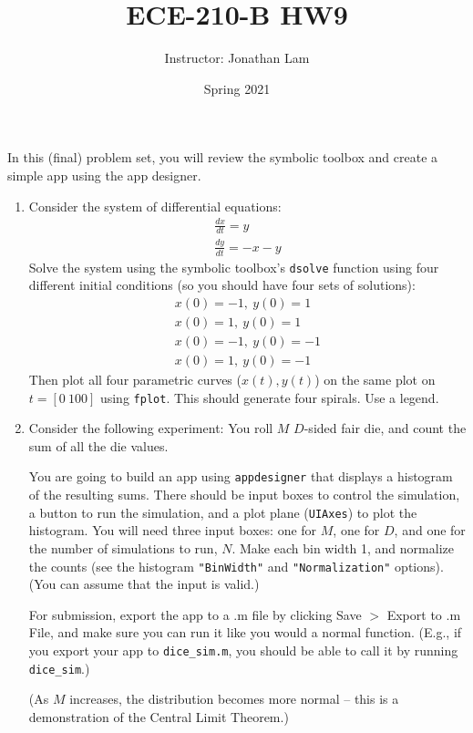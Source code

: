 \documentclass{article}
\title{ECE-210-B HW9}
\author{Instructor: Jonathan Lam}
\date{Spring 2021}
\begin{document}
	\maketitle
	
	\noindent In this (final) problem set, you will review the symbolic toolbox and create a simple app using the app designer.
	
	\begin{enumerate}
		\item Consider the system of differential equations:
		\begin{gather*}
			\frac{dx}{dt}=y\\
			\frac{dy}{dt}=-x-y
		\end{gather*}
		Solve the system using the symbolic toolbox's \lstinline|dsolve| function using four different initial conditions (so you should have four sets of solutions):
		\begin{gather*}
			x(0)=-1,\ y(0)=1\\
			x(0)=1,\ y(0)=1\\
			x(0)=-1,\ y(0)=-1\\
			x(0)=1,\ y(0)=-1
		\end{gather*}
		Then plot all four parametric curves ($x(t),y(t)$) on the same plot on $t=[0\ 100]$ using \lstinline|fplot|. This should generate four spirals. Use a legend.
		
		\item Consider the following experiment: You roll $M$ $D$-sided fair die, and count the sum of all the die values.
		
		You are going to build an app using \lstinline|appdesigner| that displays a histogram of the resulting sums. There should be input boxes to control the simulation, a button to run the simulation, and a plot plane (\lstinline|UIAxes|) to plot the histogram. You will need three input boxes: one for $M$, one for $D$, and one for the number of simulations to run, $N$. Make each bin width 1, and normalize the counts (see the histogram \lstinline|"BinWidth"| and \lstinline|"Normalization"| options). (You can assume that the input is valid.)
		
		For submission, export the app to a .m file by clicking Save $>$ Export to .m File, and make sure you can run it like you would a normal function. (E.g., if you export your app to \lstinline|dice_sim.m|, you should be able to call it by running \lstinline|dice_sim|.)
		
		(As $M$ increases, the distribution becomes more normal -- this is a demonstration of the Central Limit Theorem.)
	\end{enumerate}
	
\end{document}
